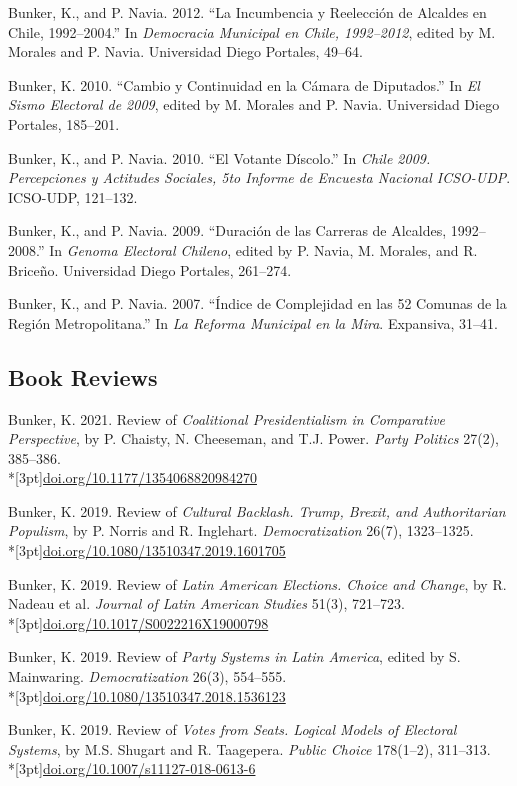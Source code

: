 \documentclass[11pt,letterpaper]{article}
\newif\ifafterhead
\newlength{\entrygap}\setlength{\entrygap}{8.5pt}
\newcommand{\gap}{\ifafterhead\global\afterheadfalse\else\vspace{\entrygap}\fi}
\newcommand{\entry}[1]{\par\gap\hangindent=13pt\hangafter=1\noindent #1\par}
\newcommand{\doi}[1]{\\*[3pt]{\small\href{https://doi.org/#1}{doi.org/#1}}}
\begin{document}
\entry{Bunker, K., and P. Navia. 2012. ``La Incumbencia y Reelección de Alcaldes en Chile, 1992--2004.'' In \textit{Democracia Municipal en Chile, 1992--2012}, edited by M. Morales and P. Navia. Universidad Diego Portales, 49--64.}

\entry{Bunker, K. 2010. ``Cambio y Continuidad en la Cámara de Diputados.'' In \textit{El Sismo Electoral de 2009}, edited by M. Morales and P. Navia. Universidad Diego Portales, 185--201.}

\entry{Bunker, K., and P. Navia. 2010. ``El Votante Díscolo.'' In \textit{Chile 2009. Percepciones y Actitudes Sociales, 5to Informe de Encuesta Nacional ICSO-UDP}. ICSO-UDP, 121--132.}

\entry{Bunker, K., and P. Navia. 2009. ``Duración de las Carreras de Alcaldes, 1992--2008.'' In \textit{Genoma Electoral Chileno}, edited by P. Navia, M. Morales, and R. Briceño. Universidad Diego Portales, 261--274.}

\entry{Bunker, K., and P. Navia. 2007. ``Índice de Complejidad en las 52 Comunas de la Región Metropolitana.'' In \textit{La Reforma Municipal en la Mira}. Expansiva, 31--41.}

\subsection{Book Reviews}
\entry{Bunker, K. 2021. Review of \textit{Coalitional Presidentialism in Comparative Perspective}, by P. Chaisty, N. Cheeseman, and T.J. Power. \textit{Party Politics} 27(2), 385--386.\doi{10.1177/1354068820984270}}

\entry{Bunker, K. 2019. Review of \textit{Cultural Backlash. Trump, Brexit, and Authoritarian Populism}, by P. Norris and R. Inglehart. \textit{Democratization} 26(7), 1323--1325.\doi{10.1080/13510347.2019.1601705}}

\entry{Bunker, K. 2019. Review of \textit{Latin American Elections. Choice and Change}, by R. Nadeau et al. \textit{Journal of Latin American Studies} 51(3), 721--723.\doi{10.1017/S0022216X19000798}}

\entry{Bunker, K. 2019. Review of \textit{Party Systems in Latin America}, edited by S. Mainwaring. \textit{Democratization} 26(3), 554--555.\doi{10.1080/13510347.2018.1536123}}

\entry{Bunker, K. 2019. Review of \textit{Votes from Seats. Logical Models of Electoral Systems}, by M.S. Shugart and R. Taagepera. \textit{Public Choice} 178(1--2), 311--313.\doi{10.1007/s11127-018-0613-6}}
\end{document}
